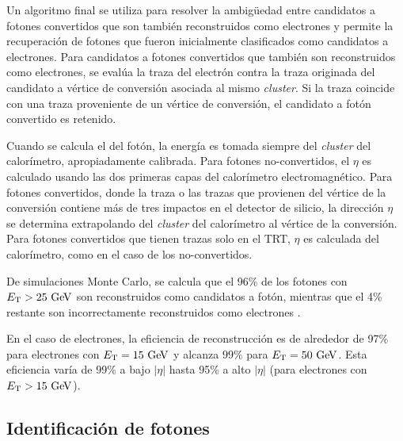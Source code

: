 Un algoritmo final \cite{Delmastro:1747242} se utiliza para resolver la
ambigüedad entre candidatos a fotones convertidos que son también reconstruidos
como electrones y permite la recuperación de fotones que fueron inicialmente
clasificados como candidatos a electrones.
Para candidatos a fotones convertidos que también son reconstruidos como
electrones, se evalúa la traza del electrón contra la traza originada del
candidato a vértice de conversión asociada al mismo \emph{cluster}. Si la traza
coincide con una traza proveniente de un vértice de conversión, el candidato a
fotón convertido es retenido.

Cuando se calcula el {\pt} del fotón, la energía es tomada siempre del \emph{cluster}
del calorímetro, apropiadamente calibrada\cite{Banfi:1259219}. Para fotones
no-convertidos, el $\eta$ es calculado usando las dos primeras capas del
calorímetro electromagnético. Para fotones convertidos, donde la traza o las
trazas que provienen del vértice de la conversión contiene más de tres impactos en
el detector de silicio, la dirección $\eta$ se determina extrapolando del
\emph{cluster} del calorímetro al vértice de la conversión. Para fotones convertidos
que tienen trazas solo en el TRT, $\eta$ es calculada del calorímetro, %
como en el caso de los no-convertidos.

De simulaciones Monte Carlo, se calcula que el 96\% de los fotones con
$\et>25\gev$ son reconstruidos como candidatos a fotón, mientras que el 4\%
restante son incorrectamente reconstruidos como electrones \cite{Delmastro:1747242}.

En el caso de electrones, la eficiencia de reconstrucción es de alrededor de
97\% para electrones con $\et=15 \gev$ y alcanza $99 \%$ para $\et=50\gev$. Esta
eficiencia varía de 99\% a bajo $|\eta|$ hasta 95\% a alto $|\eta|$ (para
electrones con $\et>15 \gev$)\cite{ATLAS-CONF-2014-032}.


\subsection{Identificación de fotones}
\label{sec:fotones}

